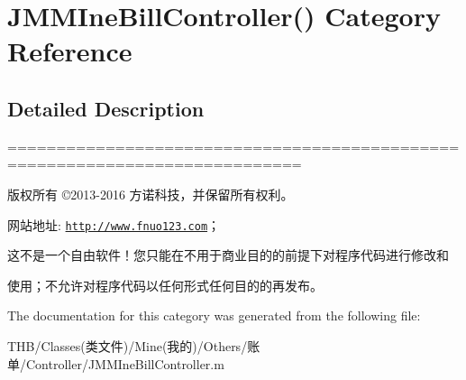 \hypertarget{category_j_m_m_ine_bill_controller_07_08}{}\section{J\+M\+M\+Ine\+Bill\+Controller() Category Reference}
\label{category_j_m_m_ine_bill_controller_07_08}


\subsection{Detailed Description}
============================================================================

版权所有 ©2013-\/2016 方诺科技，并保留所有权利。

网站地址\+: \href{http://www.fnuo123.com}{\tt http\+://www.\+fnuo123.\+com}； 



这不是一个自由软件！您只能在不用于商业目的的前提下对程序代码进行修改和

使用；不允许对程序代码以任何形式任何目的的再发布。 

 

The documentation for this category was generated from the following file\+:\begin{DoxyCompactItemize}
\item 
T\+H\+B/\+Classes(类文件)/\+Mine(我的)/\+Others/账单/\+Controller/J\+M\+M\+Ine\+Bill\+Controller.\+m\end{DoxyCompactItemize}
